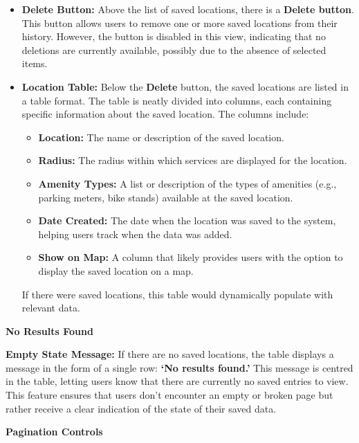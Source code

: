 \begin{itemize}
    \item{} \textbf{Delete Button:} Above the list of saved locations, there is a \textbf{Delete button}. This button allows users to remove one or more saved locations from their history. However, the button is disabled in this view, indicating that no deletions are currently available, possibly due to the absence of selected items.
    \item{} \textbf{Location Table:} Below the \textbf{Delete} button, the saved locations are listed in a table format. The table is neatly divided into columns, each containing specific information about the saved location. The columns include:
    \begin{itemize}
        \item{} \textbf{Location:} The name or description of the saved location.
        \item{} \textbf{Radius:} The radius within which services are displayed for the location.
        \item{} \textbf{Amenity Types:} A list or description of the types of amenities (e.g., parking meters, bike stands) available at the saved location.
        \item{} \textbf{Date Created:} The date when the location was saved to the system, helping users track when the data was added.
        \item{} \textbf{Show on Map:} A column that likely provides users with the option to display the saved location on a map.
    \end{itemize}

    If there were saved locations, this table would dynamically populate with relevant data.

\end{itemize}

\textbf{No Results Found}

\textbf{Empty State Message:} If there are no saved locations, the table displays a message in the form of a single row: \textbf{`No results found.'} This message is centred in the table, letting users know that there are currently no saved entries to view. This feature ensures that users don’t encounter an empty or broken page but rather receive a clear indication of the state of their saved data.

\textbf{Pagination Controls}

